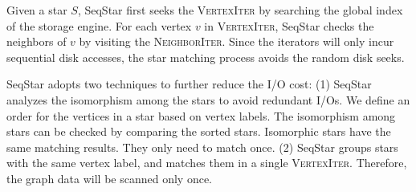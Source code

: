 Given a star $S$, SeqStar first seeks the \textsc{VertexIter} by searching the global index of the storage engine.
For each vertex $v$ in \textsc{VertexIter},
SeqStar checks the neighbors of $v$ by visiting the \textsc{NeighborIter}.
Since the iterators will only incur sequential disk accesses,
the star matching process avoids the random disk seeks.

SeqStar adopts two techniques to further reduce the I/O cost:
(1) SeqStar analyzes the isomorphism among the stars to avoid redundant I/Os.
We define an order for the vertices in a star based on vertex labels. The isomorphism among stars can be checked by comparing the sorted stars.
Isomorphic stars have the same matching results. They only need to match once.
(2) SeqStar groups stars with the same vertex label,
and matches them in a single \textsc{VertexIter}.
Therefore, the graph data will be scanned only once.

